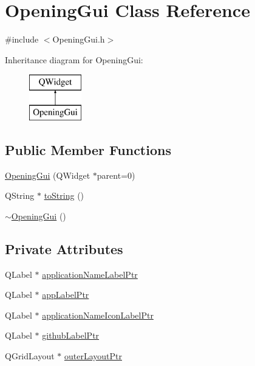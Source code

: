 \hypertarget{class_opening_gui}{\section{Opening\-Gui Class Reference}
\label{class_opening_gui}
}


{\ttfamily \#include $<$Opening\-Gui.\-h$>$}

Inheritance diagram for Opening\-Gui\-:\begin{figure}[H]
\begin{center}
\leavevmode
\includegraphics[height=2.000000cm]{class_opening_gui}
\end{center}
\end{figure}
\subsection*{Public Member Functions}
\begin{DoxyCompactItemize}
\item 
\hyperlink{class_opening_gui_a8a9621b42e164fbd73cf0ccfd64d12c5}{Opening\-Gui} (Q\-Widget $\ast$parent=0)
\item 
Q\-String $\ast$ \hyperlink{class_opening_gui_a7b46617f2b9c847fe4d5363878652143}{to\-String} ()
\item 
\hyperlink{class_opening_gui_ad299c3aa9946713fd0ad67f527f62d51}{$\sim$\-Opening\-Gui} ()
\end{DoxyCompactItemize}
\subsection*{Private Attributes}
\begin{DoxyCompactItemize}
\item 
Q\-Label $\ast$ \hyperlink{class_opening_gui_a14f81e2da5ce61335a154282bc1ba581}{application\-Name\-Label\-Ptr}
\item 
Q\-Label $\ast$ \hyperlink{class_opening_gui_a774269567530a475bbd5f5fb485ee023}{app\-Label\-Ptr}
\item 
Q\-Label $\ast$ \hyperlink{class_opening_gui_acdfc9f6f1c81e877a3837afcdfba7875}{application\-Name\-Icon\-Label\-Ptr}
\item 
Q\-Label $\ast$ \hyperlink{class_opening_gui_acc1cfdb1e87e6289a9196cfab6ff36bf}{github\-Label\-Ptr}
\item 
Q\-Grid\-Layout $\ast$ \hyperlink{class_opening_gui_a7d10dccf3f6292a7b28dc59341458200}{outer\-Layout\-Ptr}
\end{DoxyCompactItemize}


